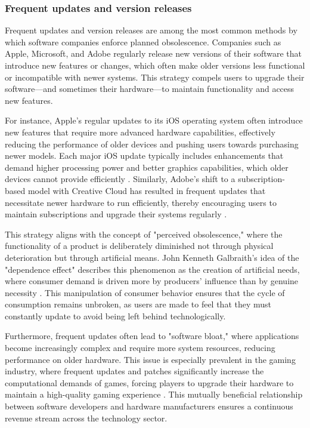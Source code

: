 \begin{refsection}
\subsubsection{Frequent updates and version releases}

Frequent updates and version releases are among the most common methods by which software companies enforce planned obsolescence. Companies such as Apple, Microsoft, and Adobe regularly release new versions of their software that introduce new features or changes, which often make older versions less functional or incompatible with newer systems. This strategy compels users to upgrade their software—and sometimes their hardware—to maintain functionality and access new features.

For instance, Apple’s regular updates to its iOS operating system often introduce new features that require more advanced hardware capabilities, effectively reducing the performance of older devices and pushing users towards purchasing newer models. Each major iOS update typically includes enhancements that demand higher processing power and better graphics capabilities, which older devices cannot provide efficiently \cite[pp.~67-70]{vogelstein2014dogfight}. Similarly, Adobe’s shift to a subscription-based model with Creative Cloud has resulted in frequent updates that necessitate newer hardware to run efficiently, thereby encouraging users to maintain subscriptions and upgrade their systems regularly \cite[pp.~150-153]{smith2021creative}.

This strategy aligns with the concept of "perceived obsolescence," where the functionality of a product is deliberately diminished not through physical deterioration but through artificial means. John Kenneth Galbraith’s idea of the "dependence effect" describes this phenomenon as the creation of artificial needs, where consumer demand is driven more by producers' influence than by genuine necessity \cite[pp.~121-124]{galbraith1999affluent}. This manipulation of consumer behavior ensures that the cycle of consumption remains unbroken, as users are made to feel that they must constantly update to avoid being left behind technologically.

Furthermore, frequent updates often lead to "software bloat," where applications become increasingly complex and require more system resources, reducing performance on older hardware. This issue is especially prevalent in the gaming industry, where frequent updates and patches significantly increase the computational demands of games, forcing players to upgrade their hardware to maintain a high-quality gaming experience \cite[pp.~83-86]{kent2001ultimate}. This mutually beneficial relationship between software developers and hardware manufacturers ensures a continuous revenue stream across the technology sector.


\end{refsection}
